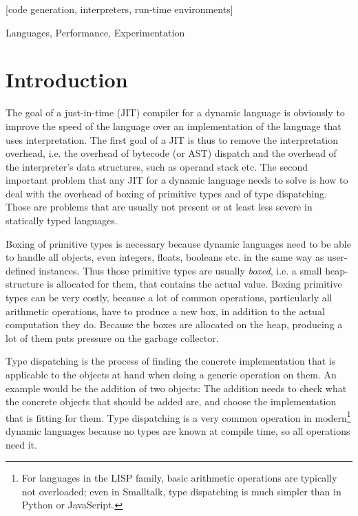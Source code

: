 \documentclass[preprint]{sigplanconf}
\begin{document}
[code generation,
interpreters, run-time environments]

\terms
Languages, Performance, Experimentation


\section{Introduction}

The goal of a just-in-time (JIT) compiler for a dynamic language is obviously to
improve the speed of the language over an implementation of the language that
uses interpretation. The first goal of a JIT is thus to remove the
interpretation overhead, i.e. the overhead of bytecode (or AST) dispatch and the
overhead of the interpreter's data structures, such as operand stack etc. The
second important problem that any JIT for a dynamic language needs to solve is
how to deal with the overhead of boxing of primitive types and of type
dispatching. Those are problems that are usually not present or at least less
severe in statically typed languages.

Boxing of primitive types is necessary because dynamic languages need to be able to handle
all objects, even integers, floats, booleans etc. in the same way as user-defined
instances. Thus those primitive types are usually \emph{boxed}, i.e. a small
heap-structure is allocated for them, that contains the actual value. Boxing
primitive types can be very costly, because a lot of common operations,
particularly all arithmetic operations, have to produce a new box, in addition
to the actual computation they do. Because the boxes are allocated on the heap,
producing a lot of them puts pressure on the garbage collector.

Type dispatching is the process of finding the concrete implementation that is
applicable to the objects at hand when doing a generic operation on them. An
example would be the addition of two objects: The addition needs to check what
the concrete objects that should be added are, and choose the implementation
that is fitting for them. Type dispatching is a very common operation in
modern\footnote{For languages in the LISP family, basic arithmetic operations
are typically not overloaded; even in Smalltalk, type dispatching is much
simpler than in Python or JavaScript.}
dynamic languages because no types are known at compile time, so all operations
need it.
\end{document}

